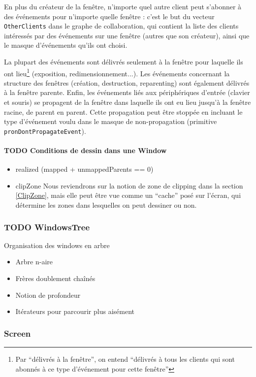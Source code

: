 En plus du créateur de la fenêtre, n'importe quel autre client peut s'abonner à des événements pour n'importe quelle fenêtre : c'est le but du vecteur \verb|OtherClients| dans le graphe de collaboration, qui contient la liste des clients intéressés par des événements sur une fenêtre (autres que son créateur), ainsi que le masque d'événements qu'ils ont choisi.

La plupart des événements sont délivrés seulement à la fenêtre pour laquelle ils ont lieu\footnote{Par ``délivrés à la fenêtre'', on entend ``délivrés à tous les clients qui sont abonnés à ce type d'événement pour cette fenêtre''} (exposition, redimensionnement...). Les événements concernant la structure des fenêtres (création, destruction, reparenting) sont également délivrés à la fenêtre parente. Enfin, les événements liés aux périphériques d'entrée (clavier et souris) se propagent de la fenêtre dans laquelle ils ont eu lieu jusqu'à la fenêtre racine, de parent en parent. Cette propagation peut être stoppée en incluant le type d'événement voulu dans le masque de non-propagation (primitive \verb|pronDontPropagateEvent|).

\paragraph{TODO Conditions de dessin dans une Window}
\begin{itemize}
  \item realized (mapped + unmappedParents == 0)
  \item clipZone Nous reviendrons sur la notion de zone de clipping dans la section \ref{ClipZone}, mais elle peut être vue comme un ``cache'' posé sur l'écran, qui détermine les zones dans lesquelles on peut dessiner ou non.
\end{itemize}

\subsubsection{TODO WindowsTree}
Organisation des windows en arbre
\begin{itemize}
  \item Arbre n-aire
  \item Frères doublement chaînés
  \item Notion de profondeur
  \item Itérateurs pour parcourir plus aisément
\end{itemize}

\subsubsection{Screen}
\label{Screen}

